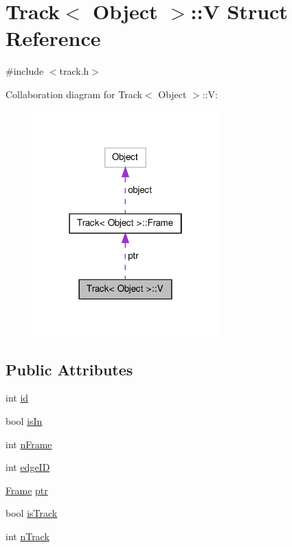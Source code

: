 \hypertarget{struct_track_1_1_v}{\section{\-Track$<$ \-Object $>$\-:\-:\-V \-Struct \-Reference}
\label{struct_track_1_1_v}
}


{\ttfamily \#include $<$track.\-h$>$}



\-Collaboration diagram for \-Track$<$ \-Object $>$\-:\-:\-V\-:
\nopagebreak
\begin{figure}[H]
\begin{center}
\leavevmode
\includegraphics[width=202pt]{struct_track_1_1_v__coll__graph}
\end{center}
\end{figure}
\subsection*{\-Public \-Attributes}
\begin{DoxyCompactItemize}
\item 
int \hyperlink{struct_track_1_1_v_a269ff7fe62ae123da1435a1b967c6b28}{id}
\item 
bool \hyperlink{struct_track_1_1_v_a7de2b199ddc675def7f13b250ec68e85}{is\-In}
\item 
int \hyperlink{struct_track_1_1_v_a7283beb46beadf59be6232bba6ea702f}{n\-Frame}
\item 
int \hyperlink{struct_track_1_1_v_aec3bb0bf355e284c09b7060fd29159d8}{edge\-I\-D}
\item 
\hyperlink{struct_track_1_1_frame}{\-Frame} \hyperlink{struct_track_1_1_v_a20c729267895989b7cb2d6f8e6c8676f}{ptr}
\item 
bool \hyperlink{struct_track_1_1_v_a3a8fa6dcc220698f6e1c53e77edb6375}{is\-Track}
\item 
int \hyperlink{struct_track_1_1_v_a914952a4c8d2faada7171d422d138a14}{n\-Track}
\end{DoxyCompactItemize}
